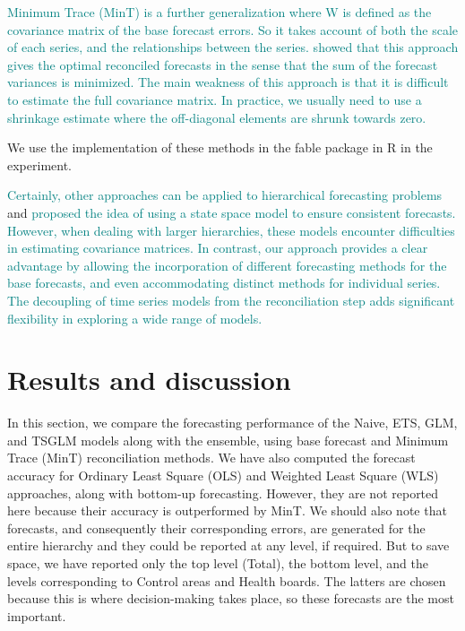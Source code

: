 \documentclass[
  authoryear,
  preprint,
  3p]{elsarticle}
\begin{document}
\textcolor{teal}{Minimum Trace (MinT) is a further generalization where W is defined as the covariance matrix of the base forecast errors. So it takes account of both the scale of each series, and the relationships between the series.}
\citet{WicEtAl2019}
\textcolor{teal}{showed that this approach gives the optimal reconciled forecasts in the sense that the sum of the forecast variances is minimized. The main weakness of this approach is that it is difficult to estimate the full covariance matrix. In practice, we usually need to use a shrinkage estimate where the off-diagonal elements are shrunk towards zero.}

We use the implementation of these methods in the fable package in R in
the experiment.

\textcolor{teal}{Certainly, other approaches can be applied to hierarchical forecasting problems}
\citet{pennings2017integrated} and \citet{villegas2018supply}
\textcolor{teal}{proposed the idea of using a state space model to ensure consistent forecasts. However, when dealing with larger hierarchies, these models encounter difficulties in estimating covariance matrices. In contrast, our approach provides a clear advantage by allowing the incorporation of different forecasting methods for the base forecasts, and even accommodating distinct methods for individual series. The decoupling of time series models from the reconciliation step adds significant flexibility in exploring a wide range of models.}

\hypertarget{sec-results}{%
\section{Results and discussion}\label{sec-results}}

In this section, we compare the forecasting performance of the Naive,
ETS, GLM, and TSGLM models along with the ensemble, using base forecast
and Minimum Trace (MinT) reconciliation methods. We have also computed
the forecast accuracy for Ordinary Least Square (OLS) and Weighted Least
Square (WLS) approaches, along with bottom-up forecasting. However, they
are not reported here because their accuracy is outperformed by MinT. We
should also note that forecasts, and consequently their corresponding
errors, are generated for the entire hierarchy and they could be
reported at any level, if required. But to save space, we have reported
only the top level (Total), the bottom level, and the levels
corresponding to Control areas and Health boards. The latters are chosen
because this is where decision-making takes place, so these forecasts
are the most important.
\end{document}
